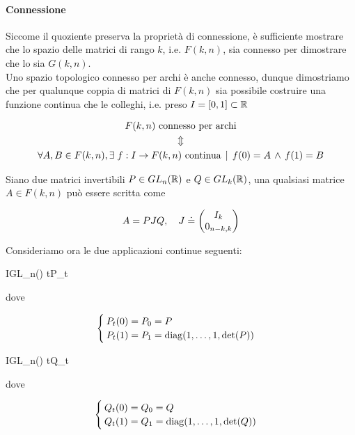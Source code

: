 \paragraph{Connessione}

Siccome il quoziente preserva la proprietà di connessione, è sufficiente mostrare che lo spazio delle matrici di rango $ k $, i.e. $ F(k,n) $, sia connesso per dimostrare che lo sia $ G(k,n) $.\\
Uno spazio topologico connesso per archi è anche connesso, dunque dimostriamo che per qualunque coppia di matrici di $ F(k,n) $ sia possibile costruire una funzione continua che le colleghi, i.e. preso $ I = [0,1] \subset \mathbb{R} $

\begin{gather}
	F(k,n) \text{ connesso per archi} \nonumber\\
	\Updownarrow\\
	\forall A, B \in F(k,n), \E f : I \to F(k,n) \text{ continua} %
	\, \mid \, f(0) = A \, \wedge \, f(1) = B \nonumber
\end{gather}

Siano due matrici invertibili $ P \in GL_{n}(\mathbb{R}) $ e $ Q \in GL_{k}(\mathbb{R}) $, una qualsiasi matrice $ A \in F(k,n) $ può essere scritta come

\begin{equation}
	A = P J Q \qcomma J \doteq \pmqty{I_{k} \\ 0_{n-k,k}}
\end{equation}

Consideriamo ora le due applicazioni continue seguenti:

	{I}{GL_{n}(\R)}
	{t}{P_{t}}

dove

\begin{equation}
	\begin{cases}
		P_{t}(0) = P_{0} = P\\
		P_{t}(1) = P_{1} = \operatorname{diag}(1,\dots,1,\det(P))
	\end{cases}
\end{equation}

	{I}{GL_{n}(\R)}
	{t}{Q_{t}}

dove

\begin{equation}
	\begin{cases}
		Q_{t}(0) = Q_{0} = Q\\
		Q_{t}(1) = Q_{1} = \operatorname{diag}(1,\dots,1,\det(Q))
	\end{cases}
\end{equation}

